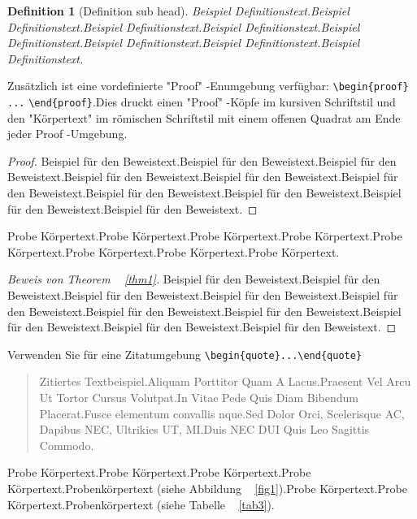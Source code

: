 \documentclass[pdflatex,sn-mathphys-num]{sn-jnl}%
\theoremstyle{thmstyleone}%
\theoremstyle{thmstyletwo}%
\theoremstyle{thmstylethree}%
\newtheorem{definition}{Definition}%
\begin{document}
\begin{definition}[Definition sub head]
Beispiel Definitionstext.Beispiel Definitionstext.Beispiel Definitionstext.Beispiel Definitionstext.Beispiel Definitionstext.Beispiel Definitionstext.Beispiel Definitionstext.Beispiel Definitionstext.
\end{definition}

Zusätzlich ist eine vordefinierte "Proof" -Enumgebung verfügbar: \verb+\begin{proof}+ \verb+...+ \verb+\end{proof}+.Dies druckt einen "Proof" -Köpfe im kursiven Schriftstil und den "Körpertext" im römischen Schriftstil mit einem offenen Quadrat am Ende jeder Proof -Umgebung.

\begin{proof}
Beispiel für den Beweistext.Beispiel für den Beweistext.Beispiel für den Beweistext.Beispiel für den Beweistext.Beispiel für den Beweistext.Beispiel für den Beweistext.Beispiel für den Beweistext.Beispiel für den Beweistext.Beispiel für den Beweistext.Beispiel für den Beweistext.
\end{proof}

Probe Körpertext.Probe Körpertext.Probe Körpertext.Probe Körpertext.Probe Körpertext.Probe Körpertext.Probe Körpertext.Probe Körpertext.

\begin{proof} [Beweis von Theorem ~ {\upshape \ref{thm1}}]
Beispiel für den Beweistext.Beispiel für den Beweistext.Beispiel für den Beweistext.Beispiel für den Beweistext.Beispiel für den Beweistext.Beispiel für den Beweistext.Beispiel für den Beweistext.Beispiel für den Beweistext.Beispiel für den Beweistext.Beispiel für den Beweistext.
\end{proof}

\noindent
Verwenden Sie für eine Zitatumgebung \verb+\begin{quote}...\end{quote}+
\begin{quote}
Zitiertes Textbeispiel.Aliquam Porttitor Quam A Lacus.Praesent Vel Arcu Ut Tortor Cursus Volutpat.In Vitae Pede Quis Diam Bibendum Placerat.Fusce elementum
convallis nque.Sed Dolor Orci, Scelerisque AC, Dapibus NEC, Ultrikies UT, MI.Duis NEC DUI Quis Leo Sagittis Commodo.
\end{quote}

Probe Körpertext.Probe Körpertext.Probe Körpertext.Probe Körpertext.Probenkörpertext (siehe Abbildung ~ \ref{fig1}).Probe Körpertext.Probe Körpertext.Probenkörpertext (siehe Tabelle ~ \ref{tab3}).
\end{document}
